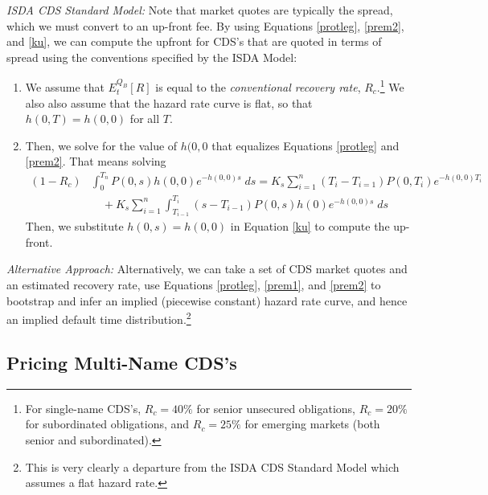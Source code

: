 \documentclass[a4paper,12pt]{scrartcl}
\begin{document}
\newpage
{\sl ISDA CDS Standard Model:} Note that market quotes are typically the
spread, which we must convert to an up-front fee.
By using Equations \ref{protleg}, 
\ref{prem2}, and \ref{ku}, we can compute the upfront for CDS's
that are quoted in terms of spread using the conventions specified by 
the ISDA Model:
\begin{enumerate}
   \item We assume that $E_t^{Q_B}[R]$ is equal to the \emph{conventional
      recovery rate}, $R_c$.\footnote{For single-name CDS's, $R_c=40\%$
      for senior unsecured obligations, $R_c = 20\%$ for subordinated
      obligations, and $R_c=25\%$ for emerging markets (both senior
      and subordinated).} We also also assume that the
      hazard rate curve is flat, so that $h(0,T) = h(0,0)$ for all $T$.
   \item Then, we solve for the value of $h(0,0$ that equalizes 
      Equations \ref{protleg} and \ref{prem2}. That means solving 
      \begin{align*}
	 (1-R_c) &\int^{T_n}_0 P(0,s) h(0,0) e^{-h(0,0)s} \; ds  
	 =  K_s  \sum^n_{i=1} (T_i - T_{i=1}) P(0,T_i)
	    e^{-h(0,0)T_i} \\
	 &\quad + K_s \sum^n_{i=1} \int^{T_i}_{T_{i-1}}
	    (s-T_{i-1}) P(0,s) h(0) e^{-h(0,0)s} \; ds 
      \end{align*}
      Then, we substitute $h(0,s)=h(0,0)$ in Equation \ref{ku} to 
      compute the up-front.
\end{enumerate}
{\sl Alternative Approach:} 
Alternatively, we can take a set of CDS market quotes and an estimated
recovery rate, use Equations \ref{protleg}, \ref{prem1}, and 
\ref{prem2} to bootstrap and infer an implied (piecewise constant)
hazard rate curve, and hence an implied default time 
distribution.\footnote{This is very clearly a departure from the ISDA
CDS Standard Model which assumes a flat hazard rate.}


\newpage
\subsection{Pricing Multi-Name CDS's}
\end{document}
